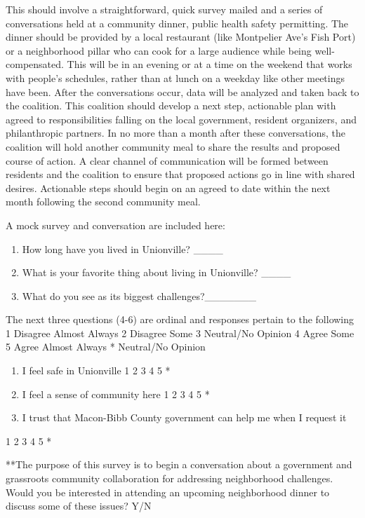 \documentclass[
]{article}
\begin{document}
This should involve a straightforward, quick survey mailed and a series
of conversations held at a community dinner, public health safety
permitting. The dinner should be provided by a local restaurant (like
Montpelier Ave's Fish Port) or a neighborhood pillar who can cook for a
large audience while being well-compensated. This will be in an evening
or at a time on the weekend that works with people's schedules, rather
than at lunch on a weekday like other meetings have been. After the
conversations occur, data will be analyzed and taken back to the
coalition. This coalition should develop a next step, actionable plan
with agreed to responsibilities falling on the local government,
resident organizers, and philanthropic partners. In no more than a month
after these conversations, the coalition will hold another community
meal to share the results and proposed course of action. A clear channel
of communication will be formed between residents and the coalition to
ensure that proposed actions go in line with shared desires. Actionable
steps should begin on an agreed to date within the next month following
the second community meal.

A mock survey and conversation are included here:

\begin{enumerate}
\def\labelenumi{\arabic{enumi}.}
\item
  How long have you lived in Unionville? \_\_\_\_
\item
  What is your favorite thing about living in Unionville? \_\_\_\_
\item
  What do you see as its biggest challenges?\_\_\_\_\_\_\_
\end{enumerate}

The next three questions (4-6) are ordinal and responses pertain to the
following 1 Disagree Almost Always 2 Disagree Some 3 Neutral/No Opinion
4 Agree Some 5 Agree Almost Always * Neutral/No Opinion

\begin{enumerate}
\def\labelenumi{\arabic{enumi}.}
\setcounter{enumi}{3}
\item
  I feel safe in Unionville 1 2 3 4 5 *
\item
  I feel a sense of community here 1 2 3 4 5 *
\item
  I trust that Macon-Bibb County government can help me when I request
  it
\end{enumerate}

1 2 3 4 5 *

**The purpose of this survey is to begin a conversation about a
government and grassroots community collaboration for addressing
neighborhood challenges. Would you be interested in attending an
upcoming neighborhood dinner to discuss some of these issues? Y/N
\end{document}
